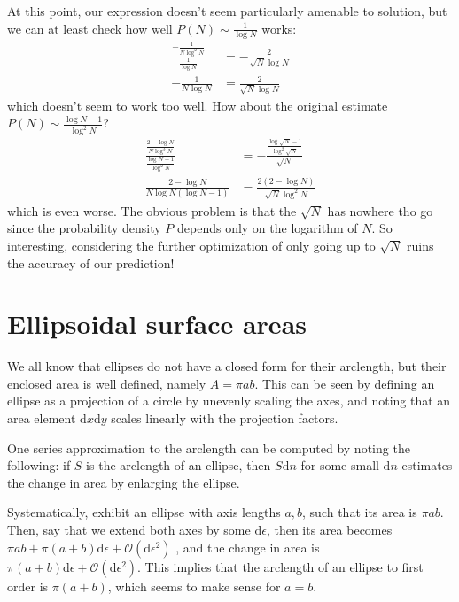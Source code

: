 \documentclass[12pt]{report}
\begin{document}
At this point, our expression doesn't seem particularly amenable to solution,
but we can at least check how well $P(N) \sim \frac{1}{\log N}$ works:
\begin{align}
    \frac{-\frac{1}{N\log^2N}}{\frac{1}{\log N}} &= -\frac{2}{\sqrt{N}\log N}\\
    -\frac{1}{N\log N} &= \frac{2}{\sqrt{N}\log N}
\end{align}
which doesn't seem to work too well. How about the original estimate $P(N) \sim
\frac{\log N - 1}{\log^2 N}$?
\begin{align}
    \frac{\frac{2 - \log N}{N\log^3 N}}{\frac{\log N - 1}{\log^2 N}} &=
    - \frac{\frac{\log\sqrt{N} - 1}{\log^2\sqrt{N}}}{\sqrt{N}}\\
    \frac{2 - \log N}{N\log N \left( \log N - 1 \right)} &= \frac{2\left( 2 -
    \log N\right)}{\sqrt{N}\log^2 N}
\end{align}
which is even worse. The obvious problem is that the $\sqrt{N}$ has nowhere tho
go since the probability density $P$ depends only on the logarithm of $N$. So
interesting, considering the further optimization of only going up to $\sqrt{N}$
ruins the accuracy of our prediction!

\clearpage
\chapter{Ellipsoidal surface areas}

We all know that ellipses do not have a closed form for their arclength, but
their enclosed area is well defined, namely $A = \pi ab$. This can be seen by
defining an ellipse as a projection of a circle by unevenly scaling the axes,
and noting that an area element $\mathrm{d}x\mathrm{d}y$ scales linearly with
the projection factors.

One series approximation to the arclength can be computed by noting the
following: if $S$ is the arclength of an ellipse, then $S\mathrm{d}n$ for some
small $\mathrm{d}n$ estimates the change in area by enlarging the ellipse.

Systematically, exhibit an ellipse with axis lengths $a,b$, such that its area
is $\pi ab$. Then, say that we extend both axes by some $\mathrm{d}\epsilon$,
then its area becomes
$\pi ab + \pi (a+b)\mathrm{d} \epsilon + \mathcal{O}(\mathrm{d}\epsilon^2)$
, and the change in area is
$\pi (a+b) \mathrm{d}\epsilon + \mathcal{O}(\mathrm{d}\epsilon^2)$.
This implies that the arclength of an ellipse to first order is $\pi(a+b)$,
which seems to make sense for $a=b$.
\end{document}
